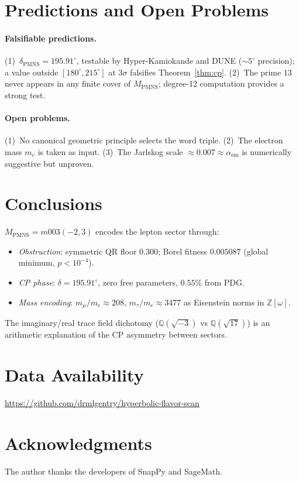 \documentclass[11pt,a4paper]{article}
\theoremstyle{definition}
\newcommand{\MPMNS}{M_{\mathrm{PMNS}}}
\newcommand{\Zom}{\mathbb{Z}[\omega]}
\begin{document}
\section{Predictions and Open Problems}
\label{sec:predictions}

\paragraph{Falsifiable predictions.}
(1)~$\delta_{\mathrm{PMNS}}=195.91^\circ$, testable by
Hyper-Kamiokande and DUNE (${\sim}5^\circ$ precision);
a value outside $[180^\circ,215^\circ]$ at $3\sigma$
falsifies Theorem~\ref{thm:cp}.
(2)~The prime $13$ never appears in any finite cover of $\MPMNS$;
degree-12 computation provides a strong test.

\paragraph{Open problems.}
(1)~No canonical geometric principle selects the word triple.
(2)~The electron mass $m_e$ is taken as input.
(3)~The Jarlskog scale $\approx0.007\approx\alpha_{\mathrm{em}}$
is numerically suggestive but unproven.

\section{Conclusions}
\label{sec:conclusions}

$\MPMNS=m003(-2,3)$ encodes the lepton sector through:
\begin{itemize}
\item \emph{Obstruction}: symmetric QR floor $0.300$;
  Borel fitness $0.005087$ (global minimum, $p<10^{-4}$).
\item \emph{CP phase}: $\delta=195.91^\circ$,
  zero free parameters, $0.55\%$ from PDG.
\item \emph{Mass encoding}: $m_\mu/m_e\approx208$,
  $m_\tau/m_e\approx3477$ as Eisenstein norms in $\Zom$.
\end{itemize}
The imaginary/real trace field dichotomy
($\mathbb{Q}(\sqrt{-3})$ vs $\mathbb{Q}(\sqrt{17})$)
is an arithmetic explanation of the CP asymmetry between sectors.

\section*{Data Availability}
\url{https://github.com/drmlgentry/hyperbolic-flavor-scan}

\section*{Acknowledgments}
The author thanks the developers of SnapPy and SageMath.
\end{document}
